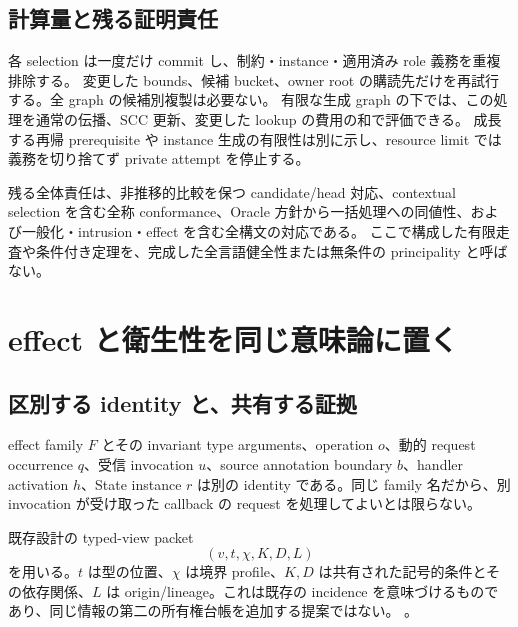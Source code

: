 \documentclass[11pt,a4paper]{article}
\theoremstyle{remark}
\newcommand{\newsrc}[2]{\href{https://github.com/momota1029/yulang/blob/d5552b3e328e53c3a60170329cd2192e4e11c097/#1}{\detokenize{#2}}}
\begin{document}
\subsection{計算量と残る証明責任}

各 selection は一度だけ commit し、制約・instance・適用済み role 義務を重複排除する。
変更した bounds、候補 bucket、owner root の購読先だけを再試行する。全 graph の候補別複製は必要ない。
有限な生成 graph の下では、この処理を通常の伝播、SCC 更新、変更した lookup の費用の和で評価できる。
成長する再帰 prerequisite や instance 生成の有限性は別に示し、resource limit では義務を切り捨てず private attempt を停止する。

残る全体責任は、非推移的比較を保つ candidate/head 対応、contextual selection を含む全称 conformance、Oracle 方針から一括処理への同値性、および一般化・intrusion・effect を含む全構文の対応である。
ここで構成した有限走査や条件付き定理を、完成した全言語健全性または無条件の principality と呼ばない。


\section{effect と衛生性を同じ意味論に置く}

\subsection{区別する identity と、共有する証拠}

effect family $F$ とその invariant type arguments、operation $o$、動的 request occurrence $q$、受信 invocation $u$、source annotation boundary $b$、handler activation $h$、State instance $r$ は別の identity である。同じ family 名だから、別 invocation が受け取った callback の request を処理してよいとは限らない。

既存設計の typed-view packet
\[
(v,t,\chi,K,D,L)
\]
を用いる。$t$ は型の位置、$\chi$ は境界 profile、$K,D$ は共有された記号的条件とその依存関係、$L$ は origin/lineage。これは既存の incidence を意味づけるものであり、同じ情報の第二の所有権台帳を追加する提案ではない。
\newsrc{notes/design/2026-10-02-typed-boundary-realization-draft.md\#L730-L753}{typed view packet}。
\end{document}
